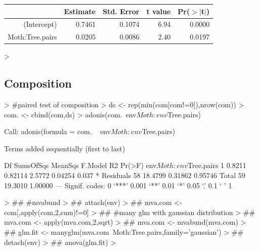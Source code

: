 \documentclass[12pt]{article}
\begin{document}
\begin{Schunk}
\begin{table}[ht]
\begin{center}
\begin{tabular}{rrrrr}
  \hline
 & Estimate & Std. Error & t value & Pr($>$$|$t$|$) \\ 
  \hline
(Intercept) & 0.7461 & 0.1074 & 6.94 & 0.0000 \\ 
  Moth:Tree.pairs & 0.0205 & 0.0086 & 2.40 & 0.0197 \\ 
   \hline
\end{tabular}
\end{center}
\end{table}\begin{Sinput}
> 
\end{Sinput}
\end{Schunk}

\subsection{Composition}
\begin{Schunk}
\begin{Sinput}
>                                         #paired test of composition
> ds <- rep(min(com[com!=0]),nrow(com))
> com. <- cbind(com,ds)
> adonis(com.~env$Moth:env$Tree.pairs)
\end{Sinput}
\begin{Soutput}
Call:
adonis(formula = com. ~ env$Moth:env$Tree.pairs) 

Terms added sequentially (first to last)

                        Df SumsOfSqs MeanSqs F.Model      R2 Pr(>F)  
env$Moth:env$Tree.pairs  1    0.8211 0.82114  2.5772 0.04254  0.037 *
Residuals               58   18.4799 0.31862         0.95746         
Total                   59   19.3010                 1.00000         
---
Signif. codes:  0 ‘***’ 0.001 ‘**’ 0.01 ‘*’ 0.05 ‘.’ 0.1 ‘ ’ 1 
\end{Soutput}
\begin{Sinput}
> ##                                         #mvabund
> ## attach(env)
> ## mva.com <- com[,apply(com,2,sum)!=0]
> ##                                         #many glm with gaussian distribution
> ## mva.com <- apply(mva.com,2,sqrt)
> ## mva.com <- mvabund(mva.com)
> ## glm.fit <- manyglm(mva.com~Moth:Tree.pairs,family='gaussian')
> ## detach(env)
> ## anova(glm.fit)
> 
\end{Sinput}
\end{Schunk}
\end{document}
